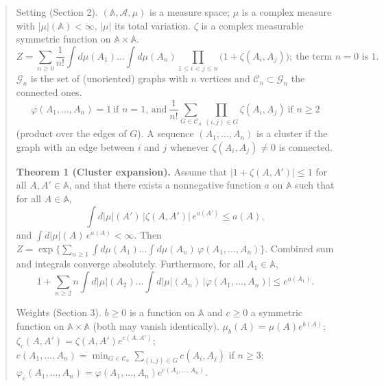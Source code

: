 \begin{quote}\small
Setting (Section 2). $(\mathbb A,\mathcal A,\mu)$ is a measure space; $\mu$ is
a complex measure with $|\mu|(\mathbb A)<\infty$, $|\mu|$ its total
variation. $\zeta$ is a complex measurable symmetric function on
$\mathbb A\times\mathbb A$.
\begin{equation*}
 Z=\sum_{n\ge0}\frac1{n!}\int d\mu(A_1)\ldots\int d\mu(A_n)
 \prod_{1\le i<j\le n}\bigl(1+\zeta(A_i,A_j)\bigr);\ \text{the term $n=0$ is 1.}\tag{1}
\end{equation*}
$\mathcal G_n$ is the set of (unoriented) graphs with $n$ vertices and
$\mathcal C_n\subset\mathcal G_n$ the connected ones.
\begin{equation*}
 \varphi(A_1,\ldots,A_n)=1\ \text{if $n=1$, and}\
 \frac1{n!}\sum_{G\in\mathcal C_n}\prod_{(i,j)\in G}\zeta(A_i,A_j)\ \text{if $n\ge2$}\tag{2}
\end{equation*}
(product over the edges of $G$). A sequence $(A_1,\ldots,A_n)$ is a cluster if
the graph with an edge between $i$ and $j$ whenever $\zeta(A_i,A_j)\ne0$ is
connected.

\textbf{Theorem 1 (Cluster expansion).} Assume that $|1+\zeta(A,A')|\le1$ for
all $A,A'\in\mathbb A$, and that there exists a nonnegative function $a$ on
$\mathbb A$ such that for all $A\in\mathbb A$,
\begin{equation*}
 \int d|\mu|(A')\,|\zeta(A,A')|\,e^{a(A')}\le a(A),\tag{3}
\end{equation*}
and $\int d|\mu|(A)\,e^{a(A)}<\infty$. Then
$Z=\exp\{\sum_{n\ge1}\int d\mu(A_1)\ldots\int d\mu(A_n)\,\varphi(A_1,\ldots,A_n)\}$.
Combined sum and integrals converge absolutely. Furthermore, for all
$A_1\in\mathbb A$,
\begin{equation*}
 1+\sum_{n\ge2}n\int d|\mu|(A_2)\ldots\int d|\mu|(A_n)\,
 |\varphi(A_1,\ldots,A_n)|\le e^{a(A_1)}.\tag{4}
\end{equation*}

Weights (Section 3). $b\ge0$ is a function on $\mathbb A$ and $c\ge0$ a
symmetric function on $\mathbb A\times\mathbb A$ (both may vanish
identically). $\mu_b(A)=\mu(A)e^{b(A)}$;
$\zeta_c(A,A')=\zeta(A,A')e^{c(A,A')}$;
$c(A_1,\ldots,A_n)=\min_{G\in\mathcal C_n}\sum_{(i,j)\in G}c(A_i,A_j)$ if
$n\ge3$; $\varphi_c(A_1,\ldots,A_n)=\varphi(A_1,\ldots,A_n)
e^{c(A_1,\ldots,A_n)}$.


\end{quote}
